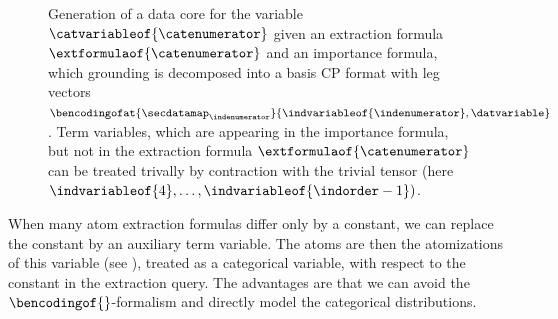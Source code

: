 


\begin{figure}[t]
    \begin{center}
        
    \end{center}
    \caption{Generation of a data core for the variable $\catvariableof{\catenumerator}$ given an extraction formula $\extformulaof{\catenumerator}$ and an importance formula, which grounding is decomposed into a basis CP format with leg vectors $\bencodingofat{\secdatamap_{\indenumerator}}{\indvariableof{\indenumerator},\datvariable}$.
    Term variables, which are appearing in the importance formula, but not in the extraction formula $\extformulaof{\catenumerator}$ can be treated trivally by contraction with the trivial tensor (here $\indvariableof{4},\ldots,\indvariableof{\indorder-1})$.
    }
    \label{fig:datacoreGeneration}
\end{figure}


When many atom extraction formulas differ only by a constant, we can replace the constant by an auxiliary term variable.
The atoms are then the atomizations of this variable (see ), treated as a categorical variable, with respect to the constant in the extraction query.
The advantages are that we can avoid the $\bencodingof{}$-formalism and directly model the categorical distributions.

